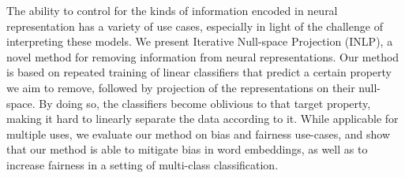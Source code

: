 The ability to control for the kinds of information encoded in neural representation has a variety of use cases, especially in light of the challenge of interpreting these models. We present Iterative Null-space Projection (INLP), a novel method for removing information from neural representations. Our method is based on repeated training of linear classifiers that predict a certain property we aim to remove, followed by projection of the representations on their null-space. By doing so, the classifiers become oblivious to that target property, making it hard to linearly separate the data according to it. While applicable for multiple uses, we evaluate our method on bias and fairness use-cases, and show that our method is able to mitigate bias in word embeddings, as well as to increase fairness in a setting of multi-class classification.
